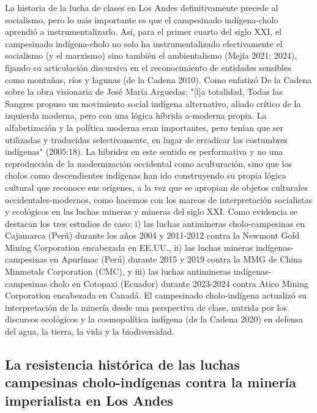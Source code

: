 \documentclass[]{interact}
\theoremstyle{plain}%
\theoremstyle{definition}
\theoremstyle{remark}
\begin{document}
La historia de la lucha de clases en Los Andes definitivamente precede al socialismo, pero lo más importante es que el campesinado indígena-cholo aprendió a instrumentalizarlo. Así, para el primer cuarto del siglo XXI, el campesinado indígena-cholo no solo ha instrumentalizado efectivamente el socialismo (y el marxismo) sino también el ambientalismo (Mejía 2021; 2024), fijando su articulación discursiva en el reconocimiento de entidades sensibles como montañas, ríos y lagunas (de la Cadena 2010). Como enfatizó De la Cadena sobre la obra visionaria de José María Arguedas: "[l]a totalidad, Todas las Sangres propuso un movimiento social indígena alternativo, aliado crítico de la izquierda moderna, pero con una lógica híbrida a-moderna propia. La alfabetización y la política moderna eran importantes, pero tenían que ser utilizadas y traducidas selectivamente, en lugar de erradicar las costumbres indígenas" (2005:18). La hibridez en este sentido es performativa y no una reproducción de la modernización occidental como aculturación, sino que los cholos como descendientes indígenas han ido construyendo su propia lógica cultural que reconoce sus orígenes, a la vez que se apropian de objetos culturales occidentales-modernos, como hacemos con los marcos de interpretación socialistas y ecológicos en las luchas mineras y mineras del siglo XXI. Como evidencia se destacan los tres estudios de caso: i) las luchas antimineras cholo-campesinas en Cajamarca (Perú) durante los años 2004 y 2011-2012 contra la Newmont Gold Mining Corporation encabezada en EE.UU., ii) las luchas mineras indígenas-campesinas en Apurímac (Perú) durante 2015 y 2019 contra la MMG de China Minmetals Corporation (CMC), y iii) las luchas antimineras indígenas-campesinas cholo en Cotopaxi (Ecuador) durante 2023-2024 contra Atico Mining Corporation encabezada en Canadá. El campesinado cholo-indígena actualizó su interpretación de la minería desde una perspectiva de clase, nutrida por los discursos ecológicos y la cosmopolítica indígena (de la Cadena 2020) en defensa del agua, la tierra, la vida y la biodiversidad.

\subsection{La resistencia histórica de las luchas campesinas cholo-indígenas contra la minería imperialista en Los Andes}
\end{document}
